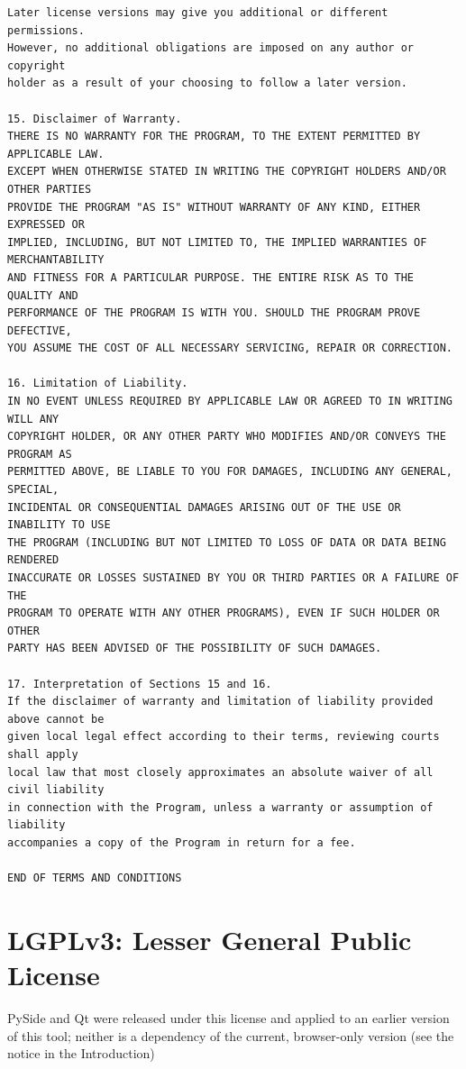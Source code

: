 \begin{verbatim}
Later license versions may give you additional or different permissions.
However, no additional obligations are imposed on any author or copyright
holder as a result of your choosing to follow a later version.

15. Disclaimer of Warranty.
THERE IS NO WARRANTY FOR THE PROGRAM, TO THE EXTENT PERMITTED BY APPLICABLE LAW.
EXCEPT WHEN OTHERWISE STATED IN WRITING THE COPYRIGHT HOLDERS AND/OR OTHER PARTIES
PROVIDE THE PROGRAM "AS IS" WITHOUT WARRANTY OF ANY KIND, EITHER EXPRESSED OR
IMPLIED, INCLUDING, BUT NOT LIMITED TO, THE IMPLIED WARRANTIES OF MERCHANTABILITY
AND FITNESS FOR A PARTICULAR PURPOSE. THE ENTIRE RISK AS TO THE QUALITY AND
PERFORMANCE OF THE PROGRAM IS WITH YOU. SHOULD THE PROGRAM PROVE DEFECTIVE,
YOU ASSUME THE COST OF ALL NECESSARY SERVICING, REPAIR OR CORRECTION.

16. Limitation of Liability.
IN NO EVENT UNLESS REQUIRED BY APPLICABLE LAW OR AGREED TO IN WRITING WILL ANY
COPYRIGHT HOLDER, OR ANY OTHER PARTY WHO MODIFIES AND/OR CONVEYS THE PROGRAM AS
PERMITTED ABOVE, BE LIABLE TO YOU FOR DAMAGES, INCLUDING ANY GENERAL, SPECIAL,
INCIDENTAL OR CONSEQUENTIAL DAMAGES ARISING OUT OF THE USE OR INABILITY TO USE
THE PROGRAM (INCLUDING BUT NOT LIMITED TO LOSS OF DATA OR DATA BEING RENDERED
INACCURATE OR LOSSES SUSTAINED BY YOU OR THIRD PARTIES OR A FAILURE OF THE
PROGRAM TO OPERATE WITH ANY OTHER PROGRAMS), EVEN IF SUCH HOLDER OR OTHER
PARTY HAS BEEN ADVISED OF THE POSSIBILITY OF SUCH DAMAGES.

17. Interpretation of Sections 15 and 16.
If the disclaimer of warranty and limitation of liability provided above cannot be
given local legal effect according to their terms, reviewing courts shall apply
local law that most closely approximates an absolute waiver of all civil liability
in connection with the Program, unless a warranty or assumption of liability
accompanies a copy of the Program in return for a fee.

END OF TERMS AND CONDITIONS

\end{verbatim}
\normalsize
\section{LGPLv3: Lesser General Public License}

PySide and Qt were released under this license and applied to an earlier
version of this tool; neither is a dependency of the current, browser-only
version (see the notice in the Introduction)

